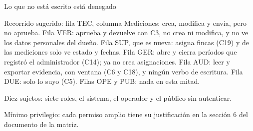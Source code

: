 \documentclass[aspectratio=169,t]{beamer}
\begin{document}
\begin{frame}{Lo que no está escrito está denegado}
{Recorrido sugerido: fila TEC, columna Mediciones: crea, modifica y envía, pero no aprueba. Fila VER:
aprueba y devuelve con C3, no crea ni modifica, y no ve los datos personales del dueño. Fila SUP, que
es nueva: asigna fincas (C19) y de las mediciones solo ve estado y fechas. Fila GER: abre y cierra
períodos que registró el administrador (C14); ya no crea asignaciones. Fila AUD: leer y exportar
evidencia, con ventana (C6 y C18), y ningún verbo de escritura. Fila DUE: solo lo suyo (C5). Filas OPE
y PUB: nada en esta mitad.

Diez sujetos: siete roles, el sistema, el operador y el público sin autenticar.

Mínimo privilegio: cada permiso amplio tiene su justificación en la sección 6 del documento de la matriz.}
\end{frame}
\end{document}
